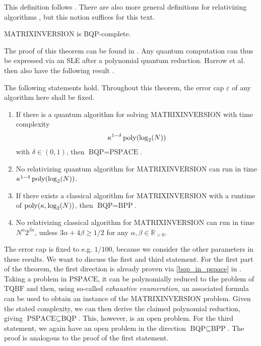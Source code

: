 This definition follows \cite[p. 12]{Harrow2008}. There are also more general definitions for relativizing algorithms \cite[pp. 376-377]{Sipser2013}, but this notion suffices for this text.

\begin{theorem}
    \(\text{MATRIXINVERSION}\) is \(\text{BQP}\)-complete.
\end{theorem}

The proof of this theorem can be found in \cite[p. 4]{Harrow2008}. Any quantum computation can thus be expressed via an SLE after a polynomial quantum reduction. Harrow et al. then also have the following result \cite[pp. 12-14]{Harrow2008}.

\begin{theorem}
    The following statements hold. Throughout this theorem, the error cap \(\varepsilon\) of any algorithm here shall be fixed.
    \begin{enumerate}[label=(\roman*)]
        \item If there is a quantum algorithm for solving \(\text{MATRIXINVERSION}\) with time complexity
        \begin{align}
            \kappa^{1-\delta}\operatorname{poly}(\log_2(N))
        \end{align}
        with \(\delta \in (0, 1)\), then \(\text{BQP} = \text{PSPACE}\).
        \item No relativizing quantum algorithm for \(\text{MATRIXINVERSION}\) can run in time \(\kappa^{1-\delta}\operatorname{poly}(\log_2(N))\).
        \item If there exists a classical algorithm for \(\text{MATRIXINVERSION}\) with a runtime of \(\operatorname{poly}(\kappa, \log_2(N))\), then \(\text{BQP} = \text{BPP}\).
        \item No relativizing classical algorithm for \(\text{MATRIXINVERSION}\) can run in time \(N^\alpha 2^{\beta \kappa}\), unless \(3\alpha+4\beta \geq 1/2\) for any \(\alpha, \beta \in \mathbb{R}_{>0}\).
    \end{enumerate}
\end{theorem}

The error cap is fixed to e.g. \(1/100\), because we consider the other parameters in these results. We want to discuss the first and third statement.  For the first part of the theorem, the first direction is already proven via \ref{bqp_in_pspace} in . Taking a problem in \(\text{PSPACE}\), it can be polynomially reduced to the problem of \(\text{TQBF}\) and then, using so-called \emph{exhaustive enumeration}, an associated formula can be used to obtain an instance of the \(\text{MATRIXINVERSION}\) problem. Given the stated complexity, we can then derive the claimed polynomial reduction, giving \(\text{PSPACE} \subseteq \text{BQP}\). This, however, is an open problem. For the third statement, we again have an open problem in the direction \(\text{BQP} \subseteq \text{BPP}\). The proof is analogous to the proof of the first statement.

